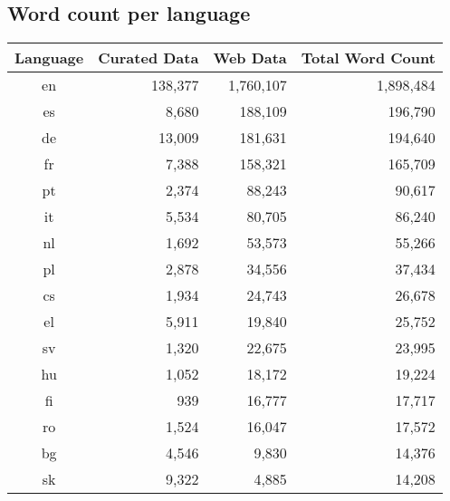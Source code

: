 \subsection{Word count per language}
\begin{table}[htb]
\centering
\begin{tabular}{crrr}
\hline
\textbf{Language} & \textbf{Curated Data} & \textbf{Web Data} & \textbf{Total Word Count}      \\ \hline
en                & 138,377                & 1,760,107              & 1,898,484                \\ 
es                & 8,680                  & 188,109                & 196,790                   \\
de                & 13,009                 & 181,631                & 194,640            \\
fr                & 7,388                  & 158,321                & 165,709               \\
pt                & 2,374                  & 88,243                 & 90,617               \\
it                & 5,534                  & 80,705                 & 86,240              \\
nl                & 1,692                  & 53,573                 & 55,266                 \\
pl                & 2,878                  & 34,556                 & 37,434               \\
cs                & 1,934                  & 24,743                 & 26,678                        \\
el                & 5,911                  & 19,840                 & 25,752           \\
sv                & 1,320                  & 22,675                 & 23,995                     \\
hu                & 1,052                  & 18,172                 & 19,224                   \\
fi                & 939                    & 16,777                 & 17,717                       \\
ro                & 1,524                  & 16,047                 & 17,572                    \\
bg                & 4,546                  & 9,830                  & 14,376                         \\
sk                & 9,322                  & 4,885                  & 14,208                       \\

\end{tabular}
\end{table}
